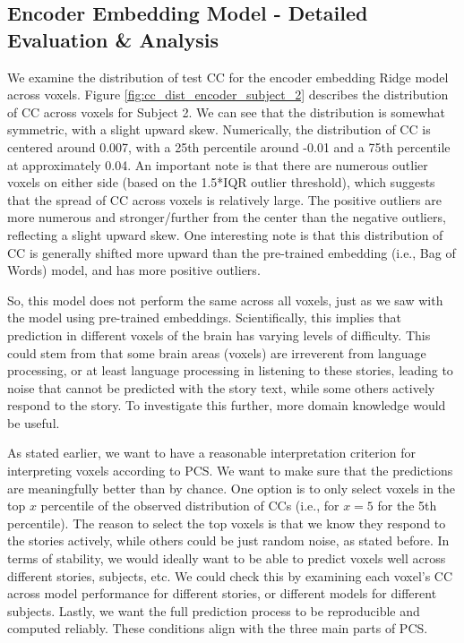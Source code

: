 \documentclass[10pt,letterpaper]{article}
\begin{document}
\subsection{Encoder Embedding Model - Detailed Evaluation \& Analysis}
We examine the distribution of test CC for the encoder embedding Ridge model across voxels. Figure \ref{fig:cc_dist_encoder_subject_2} describes the distribution of CC across voxels for Subject 2. We can see that the distribution is somewhat symmetric, with a slight upward skew. Numerically, the distribution of CC is centered around 0.007, with a 25th percentile around -0.01 and a 75th percentile at approximately 0.04. An important note is that there are numerous outlier voxels on either side (based on the 1.5*IQR outlier threshold), which suggests that the spread of CC across voxels is relatively large. The positive outliers are more numerous and stronger/further from the center than the negative outliers, reflecting a slight upward skew. One interesting note is that this distribution of CC is generally shifted more upward than the pre-trained embedding (i.e., Bag of Words) model, and has more positive outliers.

So, this model does not perform the same across all voxels, just as we saw with the model using pre-trained embeddings. Scientifically, this implies that prediction in different voxels of the brain has varying levels of difficulty. This could stem from that some brain areas (voxels) are irreverent from language processing, or at least language processing in listening to these stories, leading to noise that cannot be predicted with the story text, while some others actively respond to the story. To investigate this further, more domain knowledge would be useful.

As stated earlier, we want to have a reasonable interpretation criterion for interpreting voxels according to PCS. We want to make sure that the predictions are meaningfully better than by chance. One option is to only select voxels in the top \(x\) percentile of the observed distribution of CCs (i.e., for \(x=5\) for the 5th percentile). The reason to select the top voxels is that we know they respond to the stories actively, while others could be just random noise, as stated before. In terms of stability, we would ideally want to be able to predict voxels well across different stories, subjects, etc. We could check this by examining each voxel's CC across model performance for different stories, or different models for different subjects. Lastly, we want the full prediction process to be reproducible and computed reliably. These conditions align with the three main parts of PCS.
\end{document}
